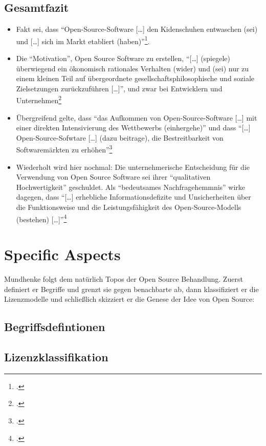 \documentclass[DIV=calc,BCOR=5mm,11pt,headings=small,oneside,abstract=true, toc=bib]{scrartcl}
\begin{document}
\subsection{Gesamtfazit}
\begin{itemize}
  \item Fakt sei, dass \enquote{Open-Source-Software [\ldots] den
  Kidenschuhen entwaschen (sei) und [\ldots] sich im Markt etabliert
  (haben)}\footcite[vgl.][223]{Mundhenke2007a}.
  \item Die \enquote{Motivation}, Open Source Software zu erstellen,
  \enquote{[\ldots] (spiegele) überwiegend ein ökonomisch rationales
  Verhalten (wider) und (sei) nur zu einem kleinen Teil auf übergeordnete
  gesellschaftsphilosophische und soziale Zielsetzungen zurückzuführen
  [\ldots]}, und zwar bei Entwicklern und
  Unternehmen\footcite[vgl.][225]{Mundhenke2007a}
  \item Übergreifend gelte, dass \enquote{das Aufkommen von
  Open-Source-Software [\ldots] mit einer direkten Intensivierung des
  Wettbewerbs (einhergehe)} und dass \enquote{[\ldots]
  Open-Source-Sofwtare [\ldots] (dazu beitrage), die Bestreitbarkeit von
  Softwaremärkten zu erhöhen}\footcite[vgl.][225]{Mundhenke2007a}
  \item Wiederholt wird hier nochmal: Die unternehmerische
  Entscheidung für die Verwendung von Open Source Software sei ihrer
  \enquote{qualitativen Hochwertigkeit} geschuldet. Als
  \enquote{bedeutsames Nachfragehemmnis} wirke dagegen, dass \enquote{[\ldots]
  erhebliche Informationsdefizite und Unsicherheiten über die
  Funktionsweise und die Leistungsfähigkeit des Open-Source-Modells
  (bestehen) [\ldots]}\footcite[vgl.][227]{Mundhenke2007a}
\end{itemize}


\section{Specific Aspects}

Mundhenke folgt dem natürlich Topos der Open Source Behandlung. Zuerst definiert
er Begriffe und grenzt sie gegen benachbarte ab, dann klassifiziert er die
Lizenzmodelle und schließlich skizziert er die Genese der Idee von Open Source:

\subsection{Begriffsdefintionen}

\subsection{Lizenzklassifikation}
\end{document}
